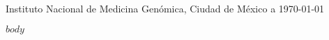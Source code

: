 \documentclass{article}
\begin{document}
  

\begin{flushright} 
Instituto Nacional de Medicina Genómica, Ciudad de México a \today
\end{flushright}

$body$
\end{document}
